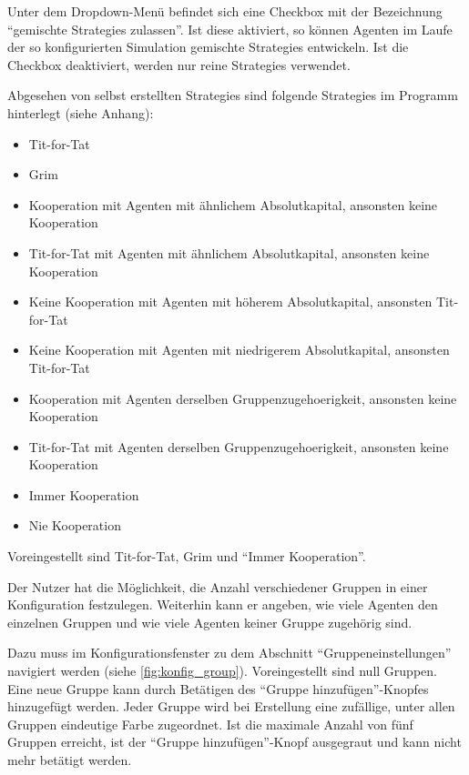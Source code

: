 \documentclass[parskip=full,11pt]{scrartcl}
\begin{document}
Unter dem Dropdown-Menü befindet sich eine Checkbox mit der Bezeichnung \enquote{\Glspl{gemischte Strategie} zulassen}. Ist diese aktiviert, so können Agenten im Laufe der so konfigurierten Simulation \glspl{gemischte Strategie} entwickeln. Ist die Checkbox deaktiviert, werden nur reine \Glspl{Strategie} verwendet.

Abgesehen von selbst erstellten \Glspl{Strategie} sind folgende \Glspl{Strategie} im Programm hinterlegt (siehe Anhang):
\begin{itemize} \itemsep -10pt
\item Tit-for-Tat
\item Grim
\item Kooperation mit Agenten mit ähnlichem Absolutkapital, ansonsten keine Kooperation
\item Tit-for-Tat mit Agenten mit ähnlichem Absolutkapital, ansonsten keine Kooperation
\item Keine Kooperation mit Agenten mit höherem Absolutkapital, ansonsten Tit-for-Tat
\item Keine Kooperation mit Agenten mit niedrigerem Absolutkapital, ansonsten Tit-for-Tat
\item Kooperation mit Agenten derselben \Gls{Gruppenzugehoerigkeit}, ansonsten keine Kooperation
\item Tit-for-Tat mit Agenten derselben \Gls{Gruppenzugehoerigkeit}, ansonsten keine Kooperation
\item Immer Kooperation
\item Nie Kooperation
\end{itemize}
Voreingestellt sind Tit-for-Tat, Grim und \enquote{Immer Kooperation}.

Der \Gls{Nutzer} hat die Möglichkeit, die Anzahl verschiedener Gruppen in einer \Gls{Konfiguration} festzulegen. Weiterhin kann er angeben, wie viele Agenten den einzelnen Gruppen und wie viele Agenten keiner Gruppe zugehörig sind.

Dazu muss im Konfigurationsfenster zu dem Abschnitt \enquote{Gruppeneinstellungen} navigiert werden (siehe \cref{fig:konfig_group}). Voreingestellt sind null Gruppen. Eine neue Gruppe kann durch Betätigen des \enquote{Gruppe hinzufügen}-Knopfes hinzugefügt werden. Jeder Gruppe wird bei Erstellung eine zufällige, unter allen Gruppen eindeutige Farbe zugeordnet. Ist die maximale Anzahl von fünf Gruppen erreicht, ist der \enquote{Gruppe hinzufügen}-Knopf ausgegraut und kann nicht mehr betätigt werden.
\end{document}
